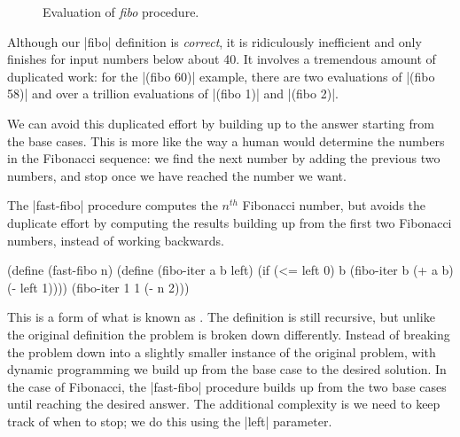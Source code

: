 \begin{schemeregion}
{\begin{figure}[bthp]
\begin{center}
\end{center}
\caption{Evaluation of \emph{fibo} procedure.\label{fig:fibo}}
\end{figure}

Although our \scheme|fibo| definition is \emph{correct}, it is ridiculously inefficient and only finishes for input numbers below about 40.  It involves a tremendous amount of duplicated work: for the \scheme|(fibo 60)| example, there are two evaluations of \scheme|(fibo 58)| and over a trillion evaluations of \scheme|(fibo 1)| and \scheme|(fibo 2)|.  

We can avoid this duplicated effort by  building up to the answer starting from the base cases.  This is more like the way a human would determine the numbers in the Fibonacci sequence: we find the next number by adding the previous two numbers, and stop once we have reached the number we want.  

The \scheme|fast-fibo| procedure computes the $n^{th}$ Fibonacci number, but avoids the duplicate effort by computing the results building up from the first two Fibonacci numbers, instead of working backwards.  

\begin{schemedisplay}
(define (fast-fibo n)
  (define (fibo-iter a b left)
    (if (<= left 0) b
        (fibo-iter b (+ a b) (- left 1))))
  (fibo-iter 1 1 (- n 2)))
\end{schemedisplay}

This is a form of what is known as .  The definition is still recursive, but unlike the original definition the problem is broken down differently.  Instead of breaking the problem down into a slightly smaller instance of the original problem, with dynamic programming we build up from the base case to the desired solution.  In the case of Fibonacci, the \scheme|fast-fibo| procedure builds up from the two base cases until reaching the desired answer.  The additional complexity is we need to keep track of when to stop; we do this using the \scheme|left| parameter.

}
\end{schemeregion}
